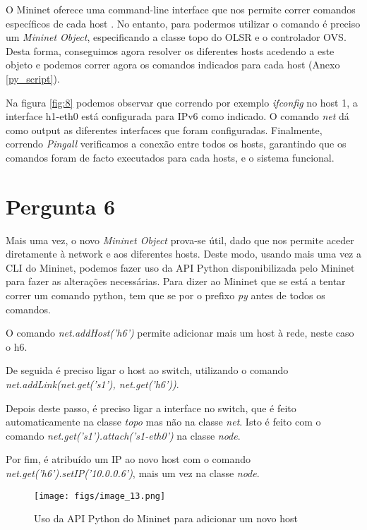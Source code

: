 O Mininet oferece uma command-line interface que nos permite correr comandos específicos de cada host \cite{mininet}.
No entanto, para podermos utilizar o comando é preciso um \textit{Mininet Object}, especificando a classe topo do OLSR e o controlador OVS.
Desta forma, conseguimos agora resolver os diferentes hosts acedendo a este objeto e podemos correr agora os comandos indicados para cada host (Anexo \ref{py_script}).

Na figura \ref{fig:8} podemos observar que correndo por exemplo \textit{ifconfig} no host 1, a interface h1-eth0 está configurada para IPv6 como indicado.
O comando \textit{net} dá como output as diferentes interfaces que foram configuradas.
Finalmente, correndo \textit{Pingall} verificamos a conexão entre todos os hosts, garantindo que os comandos foram de facto executados para cada hosts,
e o sistema funcional.

\section{Pergunta 6} \label{ex6}

Mais uma vez, o novo \textit{Mininet Object} prova-se útil, dado que nos permite aceder diretamente à network e aos diferentes hosts.
Deste modo, usando mais uma vez a CLI do Mininet, podemos fazer uso da API Python disponibilizada pelo Mininet para fazer as alterações necessárias.
Para dizer ao Mininet que se está a tentar correr um comando python, tem que se por o prefixo \textit{py} antes de todos os comandos.

O comando \textit{net.addHost('h6')} permite adicionar mais um host à rede, neste caso o h6.

De seguida é preciso ligar o host ao switch, utilizando o comando \textit{net.addLink(net.get('s1'), net.get('h6'))}.

Depois deste passo, é preciso ligar a interface no switch, que é feito automaticamente na classe \textit{topo} mas não na classe \textit{net}.
Isto é feito com o comando \textit{net.get('s1').attach('s1-eth0')} na classe \textit{node}.

Por fim, é atribuído um IP ao novo host com o comando \textit{net.get('h6').setIP('10.0.0.6')}, mais um vez na classe \textit{node}.

\begin{figure}[H]
    \centering
    \texttt{[image: figs/image\_13.png]}
    \caption{Uso da API Python do Mininet para adicionar um novo host}
    \label{fig:9}
\end{figure}

